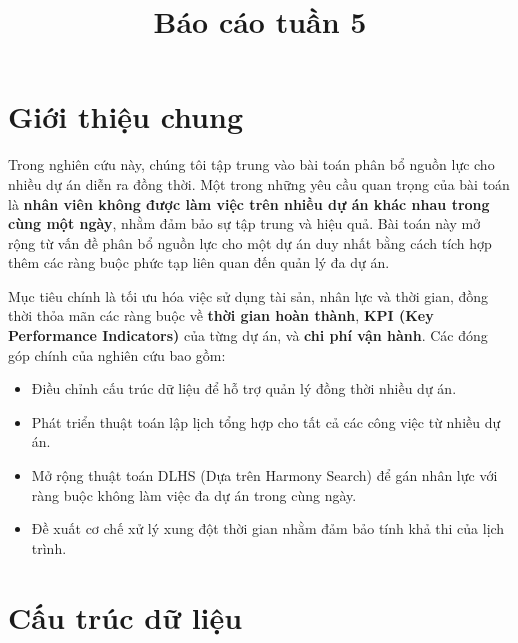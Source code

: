 \documentclass{article}
\title{Báo cáo tuần 5}
\author{}
\date{}
\begin{document}
\maketitle

\section{Giới thiệu chung}

Trong nghiên cứu này, chúng tôi tập trung vào bài toán phân bổ nguồn lực cho nhiều dự án diễn ra đồng thời. Một trong những yêu cầu quan trọng của bài toán là \textbf{nhân viên không được làm việc trên nhiều dự án khác nhau trong cùng một ngày}, nhằm đảm bảo sự tập trung và hiệu quả. Bài toán này mở rộng từ vấn đề phân bổ nguồn lực cho một dự án duy nhất bằng cách tích hợp thêm các ràng buộc phức tạp liên quan đến quản lý đa dự án.

Mục tiêu chính là tối ưu hóa việc sử dụng tài sản, nhân lực và thời gian, đồng thời thỏa mãn các ràng buộc về \textbf{thời gian hoàn thành}, \textbf{KPI (Key Performance Indicators)} của từng dự án, và \textbf{chi phí vận hành}. Các đóng góp chính của nghiên cứu bao gồm:
\begin{itemize}
    \item Điều chỉnh cấu trúc dữ liệu để hỗ trợ quản lý đồng thời nhiều dự án.
    \item Phát triển thuật toán lập lịch tổng hợp cho tất cả các công việc từ nhiều dự án.
    \item Mở rộng thuật toán DLHS (Dựa trên Harmony Search) để gán nhân lực với ràng buộc không làm việc đa dự án trong cùng ngày.
    \item Đề xuất cơ chế xử lý xung đột thời gian nhằm đảm bảo tính khả thi của lịch trình.
\end{itemize}

\section{Cấu trúc dữ liệu}
\end{document}
